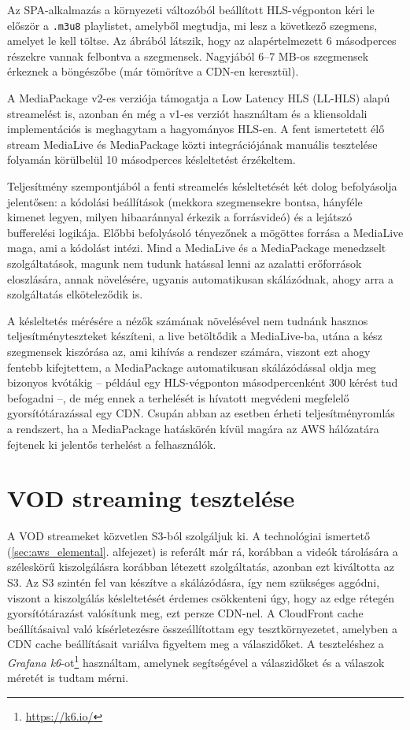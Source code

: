 Az SPA-alkalmazás a környezeti változóból beállított HLS-végponton kéri le először a \verb|.m3u8| playlistet, amelyből megtudja, mi lesz a következő szegmens, amelyet le kell töltse. Az ábrából látszik, hogy az alapértelmezett 6 másodperces részekre vannak felbontva a szegmensek. Nagyjából 6--7 MB-os szegmensek érkeznek a böngészőbe (már tömörítve a CDN-en keresztül).

A MediaPackage v2-es verziója támogatja a Low Latency HLS (LL-HLS) alapú streamelést is, azonban én még a v1-es verziót használtam és a kliensoldali implementációs is meghagytam a hagyományos HLS-en. A fent ismertetett élő stream MediaLive és MediaPackage közti integrációjának manuális tesztelése folyamán körülbelül 10 másodperces késleltetést érzékeltem.

Teljesítmény szempontjából a fenti streamelés késleltetését két dolog befolyásolja jelentősen: a kódolási beállítások (mekkora szegmensekre bontsa, hányféle kimenet legyen, milyen hibaaránnyal érkezik a forrásvideó) és a lejátszó bufferelési logikája. Előbbi befolyásoló tényezőnek a mögöttes forrása a MediaLive maga, ami a kódolást intézi. Mind a MediaLive és a MediaPackage menedzselt szolgáltatások, magunk nem tudunk hatással lenni az azalatti erőforrások eloszlására, annak növelésére, ugyanis automatikusan skálázódnak, ahogy arra a szolgáltatás elköteleződik is.

A késleltetés mérésére a nézők számának növelésével nem tudnánk hasznos teljesítményteszteket készíteni, a live betöltődik a MediaLive-ba, utána a kész szegmensek kiszórása az, ami kihívás a rendszer számára, viszont ezt ahogy fentebb kifejtettem, a MediaPackage automatikusan skálázódással oldja meg bizonyos kvótákig -- például egy HLS-végponton másodpercenként 300 kérést tud befogadni\cite{empQuotas} --, de még ennek a terhelését is hívatott megvédeni megfelelő gyorsítótárazással egy CDN. Csupán abban az esetben érheti teljesítményromlás a rendszert, ha a MediaPackage hatáskörén kívül magára az AWS hálózatára fejtenek ki jelentős terhelést a felhasználók.\cite{latency}

\section{VOD streaming tesztelése}\label{sec:vod_test}

A VOD streameket közvetlen S3-ból szolgáljuk ki. A technológiai ismertető (\ref{sec:aws_elemental}. alfejezet) is referált már rá, korábban a videók tárolására a széleskörű kiszolgálásra korábban létezett szolgáltatás, azonban ezt kiváltotta az S3.\cite{Mediastore} Az S3 szintén fel van készítve a skálázódásra\cite{s3perf}, így nem szükséges aggódni, viszont a kiszolgálás késleltetését érdemes csökkenteni úgy, hogy az edge rétegén gyorsítótárazást valósítunk meg, ezt persze CDN-nel. A CloudFront cache beállításaival való kísérletezésre összeállítottam egy tesztkörnyezetet, amelyben a CDN cache beállításait variálva figyeltem meg a válaszidőket. A teszteléshez a \emph{Grafana k6}-ot\footnote{\url{https://k6.io/}} használtam, amelynek segítségével a válaszidőket és a válaszok méretét is tudtam mérni.\cite{loadtests}

